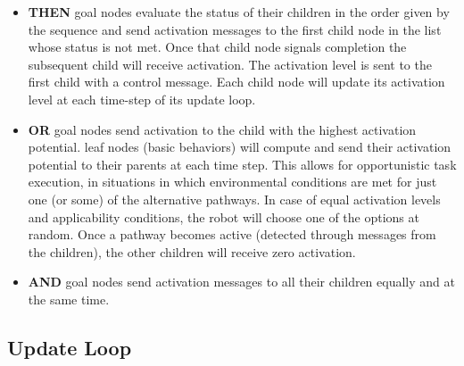 \documentclass[conference]{article}
\begin{document}
\begin{itemize}

\item {\bf THEN} goal nodes evaluate the status of their children in the order given by the sequence and send activation messages to the first child node in the list whose status is not met. Once that child node signals completion the subsequent child will receive activation. The 
activation level is sent to the first child with a control message.
Each child node will update its activation level at each time-step of its update loop.

\item {\bf OR} goal nodes send activation to the child with the highest activation potential. leaf nodes (basic behaviors) will compute and send their activation potential to their parents at each time step. This allows for opportunistic task execution, in situations in which environmental conditions are met for just one (or some) of the alternative pathways. In case of equal activation levels and applicability conditions, the robot will choose one of the options at random. Once a pathway becomes active (detected through messages from the children), the other children will receive zero activation.

\item {\bf AND} goal nodes send activation messages to all their children equally and at the same time.
\end{itemize}


\subsection{Update Loop}
\label{implementation}
\end{document}
